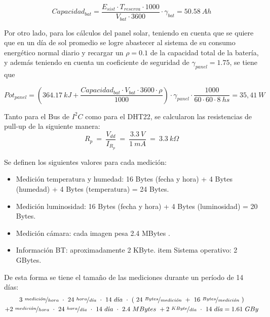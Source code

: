 \begin{equation}
Capacidad_{bat} = \frac{E_{sist}\cdot T_{reserva}\cdot 1000}{V_{bat}\cdot 3600}\cdot \gamma_{bat} = 50.58 \ Ah
\end{equation}

Por otro lado, para los cálculos del panel solar, teniendo en cuenta que se quiere que en un día de sol promedio se logre abastecer al sistema de su consumo energético normal diario y recargar un $\rho = 0.1$ de la capacidad total de la batería, y además teniendo en cuenta un coeficiente de seguridad de $\gamma_{panel} = 1.75$, se tiene que

\begin{equation}
Pot_{panel} = \left( 364.17 \ kJ + \frac{Capacidad_{bat}\cdot V_{bat}\cdot 3600\cdot \rho}{1000}\right)\cdot \gamma_{panel} \cdot  \frac{1000}{60\cdot 60\cdot 8 \ hs} = 35,41 \ W
\end{equation}


Tanto para el Bus de $I^2C$ como para el DHT22, se calcularon las resistencias de pull-up de la siguiente manera:
\begin{equation}
	R_p \ = \  \frac{V_{dd}}{I_{R_p}} \ = \ \frac{3.3 \ V}{1 \ mA} \ = \ 3.3 \ k\Omega  
\end{equation}

Se definen los siguientes valores para cada medici\'on:
\begin{itemize}
	\item Medición temperatura y humedad: 16 Bytes (fecha y hora) + 4 Bytes (humedad) + 4 Bytes (temperatura) = 24 Bytes.
	\item Medición luminosidad: 16 Bytes (fecha y hora) + 4 Bytes (luminosidad) = 20 Bytes.
	\item Medición cámara: cada imagen pesa 2.4 MBytes \cite{ref:rpicam}.
	\item Información BT: aproximadamente 2 KByte.
	item Sistema operativo: 2 GBytes.
\end{itemize}

De esta forma se tiene el tamaño de las mediciones durante un período de 14 días:
\begin{multline*}
	3 \ \nicefrac{medici\acute{o}n}{hora} \  \cdot \ 24 \ \nicefrac{hora}{d\acute{\imath}a} \  \cdot \ 14 \ d\acute{\imath}a \  \cdot \ ( \ 24 \  \nicefrac{Bytes}{medici\acute{o}n} \  + \ 16 \ \nicefrac{Bytes}{medici\acute{o}n} \ ) \\ + 2 \ \nicefrac{medici\acute{o}n}{hora} \  \cdot \ 24 \ \nicefrac{hora}{d\acute{\imath}a} \  \cdot \ 14 \ d\acute{\imath}a \  \cdot \  2.4 \ MBytes \ + 2 \ \nicefrac{KByte}{d\acute{\imath}a} \  \cdot \  14 \ d\acute{\imath}a = 1.61 \ GBy
\end{multline*}

